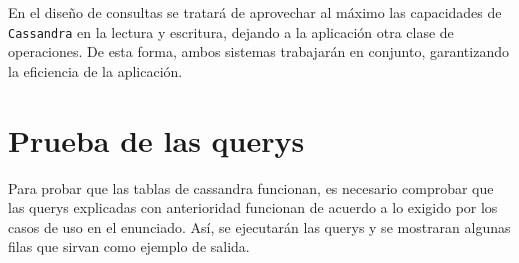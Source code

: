 \documentclass[]{article}
\begin{document}
En el diseño de consultas se tratará de aprovechar al máximo las capacidades de
\texttt{Cassandra} en la lectura y escritura, dejando a la aplicación otra clase de
operaciones. De esta forma, ambos sistemas trabajarán en conjunto, garantizando
la eficiencia de la aplicación.


% 

\section{Prueba de las querys}
Para probar que las tablas de cassandra funcionan, es necesario comprobar que las querys explicadas con anterioridad funcionan de acuerdo a lo exigido por los casos de uso en el enunciado. Así, se ejecutarán las querys y se mostraran algunas filas que sirvan como ejemplo de salida.
\end{document}
